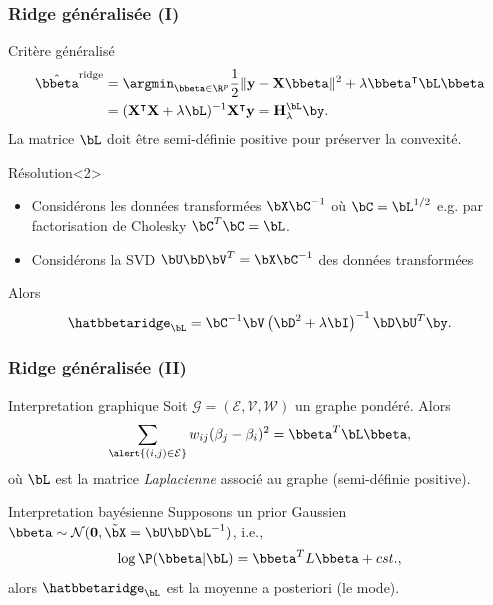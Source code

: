 \documentclass{beamer}\usepackage[]{graphicx}\usepackage[]{color}
\begin{document}
\begin{frame}
  \frametitle{Ridge généralisée (I)}

  \begin{block}{Critère généralisé}
    \begin{align*}
      \hat{\bbeta}^{\text{ridge}} &  =   \argmin_{\bbeta\in\R^p}  \frac{1}{2}
      \|\mathbf{y} - \mathbf{X} \bbeta\|^2 + \lambda \bbeta^\intercal\bL\bbeta\\
      & = (\mathbf{X}^\intercal \mathbf{X} +
      \lambda \bL)^{-1} \mathbf{X}^\intercal \mathbf{y} = \mathbf{H}_{\lambda}^{\bL} \by.
    \end{align*}
    La matrice $\bL$ doit être semi-définie positive pour préserver la convexité.
  \end{block}

  \vfill

  \begin{block}{Résolution}<2>
    \begin{itemize}
      \item Considérons les données transformées $\bX \bC^{-1}$ où
    $\bC=\bL^{1/2}$  e.g.   par factorisation de Cholesky
    $\bC^T \bC = \bL$.
        \item Considérons la SVD  $\bU\bD\bV^T=\bX \bC^{-1}$ des données transformées
    \end{itemize}
    Alors
    \begin{equation*}
      \hatbbetaridge_{\bL}
      = \bC^{-1} \bV \left(\bD^2+\lambda\bI\right)^{-1}\bD \bU^T \by.
    \end{equation*}
  \end{block}

\end{frame}

\begin{frame}
  \frametitle{Ridge généralisée (II)}

  \begin{block}{Interpretation graphique}
    Soit $\mathcal{G} = (\mathcal{E}, \mathcal{V}, \mathcal{W})$ un graphe pondéré. Alors
    \begin{equation*}
      \sum_{\alert{(i,j)\in\mathcal{E}}} w_{ij}  (\beta_j-\beta_i)^2 =
    \bbeta^T \bL \bbeta,
    \end{equation*}
    où $\bL$ est la matrice \textit{Laplacienne} associé au graphe (semi-définie positive).
  \end{block}

  \vfill

  \begin{block}{Interpretation bayésienne}
    Supposons un prior Gaussien $\bbeta\sim\mathcal{N}(\mathbf{0},
    \tilde{\bX} = \bU\bD\bL^{-1})$, i.e.,
    \begin{equation*}
      \log\P(\bbeta|\bL) = \bbeta^T L \bbeta + cst.,
    \end{equation*}
    alors $\hatbbetaridge_{\bL}$ est la moyenne a posteriori (le mode).
  \end{block}

\end{frame}
\end{document}
